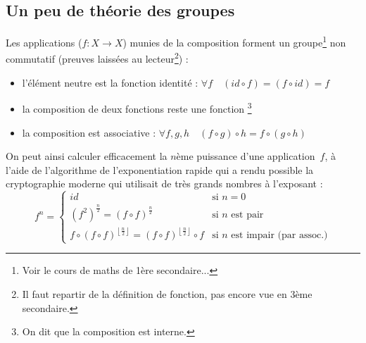 \documentclass[11pt,a4paper,oneside]{article}
\begin{document}
\subsection{Un peu de théorie des groupes}
Les applications ($f:X\rightarrow X$) munies de la composition forment un
groupe\footnote{Voir le cours de maths de 1ère secondaire...} non commutatif
(preuves laissées au lecteur\footnote{Il faut repartir de la définition de
fonction, pas encore vue en 3ème secondaire.}) :
\begin{itemize}
\item l'élément neutre est la fonction identité :
	$\forall f \quad (id\circ f) = (f\circ id) = f$
\item la composition de deux fonctions reste une fonction
	\footnote{On dit que la composition est interne.}
\item la composition est associative :
	$\forall f, g, h \quad (f\circ g)\circ h = f\circ (g\circ h)$
\end{itemize}

On peut ainsi calculer efficacement la $n$ème puissance d'une application~$f$,
à l'aide de l'algorithme de l'exponentiation rapide qui a rendu possible la
cryptographie moderne qui utilisait de très grands nombres à l'exposant : \[
	f^n = \left\{\begin{array}{ll}
		id &
			\text{si $n=0$} \\
		\left(f^2\right)^{\frac n2} = \left(f\circ f\right)^{\frac n2} &
			\text{si $n$ est pair} \\
		f\circ \left(f\circ f\right)^{\left\lfloor\frac n2\right\rfloor} =
		\left(f\circ f\right)^{\left\lfloor\frac n2\right\rfloor}\circ f &
			\text{si $n$ est impair (par assoc.)}
	\end{array}\right.
\]

\end{document}
